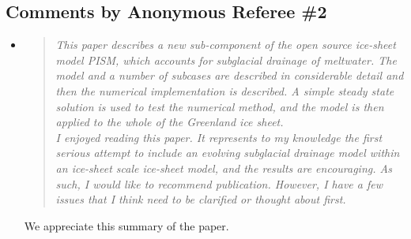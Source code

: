 \documentclass[11pt,reqno]{amsart}
\newcommand{\reply}[2]{
\medskip\medskip
\item  \begin{quote}
\emph{#1}
\end{quote}

\medskip
\noindent #2}
\begin{document}
\subsection*{Comments by Anonymous Referee \#2}\begin{itemize}
\reply{This paper describes a new sub-component of the open source ice-sheet model PISM,
which accounts for subglacial drainage of meltwater.  The model and a number of
subcases are described in considerable detail and then the numerical implementation
is described.  A simple steady state solution is used to test the numerical method, and
the model is then applied to the whole of the Greenland ice sheet.\\
\indent I enjoyed reading this paper.  It represents to my knowledge the first serious attempt
to include an evolving subglacial drainage model within an ice-sheet scale ice-sheet
model, and the results are encouraging.  As such, I would like to recommend publication.  However, I have a few issues that I think need to be clarified or thought about first.}
{We appreciate this summary of the paper.}


\end{itemize}
\end{document}
